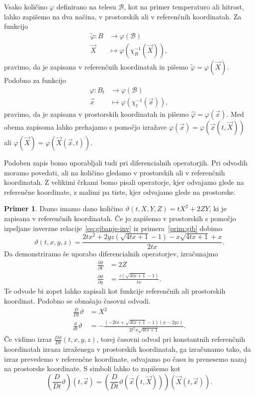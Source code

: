 \documentclass[12pt,a4paper]{article}
\theoremstyle{definition} %
\newtheorem{primer}[definicija]{Primer}
\theoremstyle{plain} %
\numberwithin{equation}{section}
\newcommand{\B}{\mathcal{B}}
\renewcommand{\phi}{\varphi}
\newcommand{\dpar}[2]{\ensuremath{\frac{\partial #1}{\partial #2}}}
\newcommand{\dd}[2]{\ensuremath{\frac{d #1}{d #2}}}
\newcommand{\ddt}[1]{\dd{#1}{t}}
\newcommand{\DD}[2]{\ensuremath{\frac{D #1}{D #2}}}
\newcommand{\DDt}[1]{\DD{#1}{t}}
\newcommand{\vX}{\vec{X}}
\newcommand{\vx}{\vec{x}}
\begin{document}
Vsako količino $\phi$ definirano na telesu $\B$, kot na primer temperaturo ali
hitrost, lahko zapišemo na dva načina, v
prostorskih ali v referenčnih koordinatah. Za funkcijo
\begin{align}
  \tilde \phi\colon B &\to \phi(\B) \nonumber \\
  \vX&\mapsto \phi(\chi_R^{-1}(\vX)), \label{eq:toref}
\end{align}
pravimo, da je zapisana v referenčnih koordinatah in pišemo $\tilde\phi =
\phi(\vX)$.
Podobno za funkcijo
\begin{align}
  \hat \phi\colon B_t &\to \phi(\B) \nonumber \\
  \vx&\mapsto \phi(\chi_t^{-1}(\vx)), \label{eq:topro}
\end{align}
pravimo, da je zapisana v prostorskih koordinatah in pišemo $\hat\phi = \phi(\vx)$.
Med obema zapisoma lahko prehajamo s pomočjo izražave $\phi(\vx) = \phi(\vx(t, \vX))$
ali $\phi(\vX) = \phi(\vX(\vx, t))$.

Podoben zapis bomo uporabljali tudi pri diferencialnih operatorjih. Pri odvodih
moramo povedati, ali na količino gledamo v prostorskih ali v referenčnih
koordinatah. Z velikimi črkami bomo pisali operatorje, kjer odvajamo glede na
referenčne koordinate, z malimi pa tiste, kjer odvajamo glede na prostorske.

\begin{primer}
  Damo imamo dano količino $\vartheta(t, X, Y, Z) = tX^2 + 2 ZY$, ki je zapisana v
  referenčnih koordinatah. Če jo zapišemo v prostorskih s pomočjo izpeljane
  inverzne relacije~\eqref{eq:gibanje-inv} iz primera~\ref{prim:gib} dobimo
  \[
    \vartheta(t, x, y, z) = \frac{2 t x^2+2 y z \left(\sqrt{4 t x+1}-1\right)-x
    \sqrt{4 t x+1}+x}{2 t x}.
  \]
  Da demonstriramo še uporabo diferencialnih operatorjev, izračunajmo
  \begin{align*}
    \dpar{\vartheta}{Y} &= 2Z  \\
    \dpar{\vartheta}{y} &= \frac{z \left(\sqrt{4 t x+1}-1\right)}{t x}.
  \end{align*}
  Te odvode bi zopet lahko zapisali kot funkcije referenčnih ali prostorskih
  koordinat. Podobno se obnašajo časovni odvodi.
  \begin{align*}
    \DDt{} \vartheta &= X^2 \\
    \ddt{} \vartheta &=  -\frac{\left(-2 t x+\sqrt{4 t x+1}-1\right) (x-2 y
    z)}{2 t^2 x \sqrt{4 t x+1}}.
  \end{align*}
  Če vidimo izraz $\DDt \vartheta(t, x, y, z)$, torej časovni odvod pri
  konstantnih referenčnih koordinatah  izraza izraženega v prostorskih
  koordinatah, ga izračunamo tako, da izraz prevedemo v referenčne koordinate,
  odvajamo po času in prenesemo nazaj na prostorske koordinate. S simboli
  lahko to zapišemo kot
  \[
    \left(\DDt{} \vartheta\right)(t, \vx) = \left( \DDt{}\vartheta(\vx(t, \vX))
    \right)(\vX(t, \vx)).
  \]
\end{primer}
\end{document}

